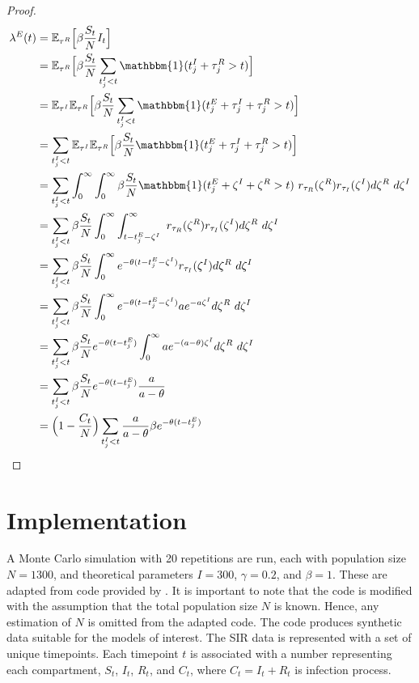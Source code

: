 \documentclass[12pt]{article}
\begin{document}
\begin{proof}
\begin{align*}
  \lambda^{E}(t) &= \mathbb{E}_{\tau^R} \Big [ \beta \frac{S_t}{N} I_t  \Big ] \\
  &= \mathbb{E}_{\tau^R} \Big [ \beta \frac{S_t}{N}  \sum_{t_j^I < t} \mathbbm{1} (t_j^I + \tau_j^R > t)  \Big ] \\
  &=  \mathbb{E}_{\tau^I} \mathbb{E}_{\tau^R} \Big [ \beta \frac{S_t}{N}  \sum_{t_j^I < t} \mathbbm{1} (t_j^E + \tau_j^I + \tau_j^R > t)  \Big ] \\
  &=  \sum_{t_j^I < t} \mathbb{E}_{\tau^I} \mathbb{E}_{\tau^R} \Big [ \beta \frac{S_t}{N} \mathbbm{1} (t_j^E + \tau_j^I + \tau_j^R > t)  \Big ] \\
  &=  \sum_{t_j^I < t} \int_0^\infty \int_0^\infty \beta \frac{S_t}{N}  \mathbbm{1} (t_j^E + \zeta^I + \zeta^R > t)\ r_{\tau_R}(\zeta^R) r_{\tau_I}(\zeta^I) d\zeta^R\ d\zeta^I \\
  &=  \sum_{t_j^I < t} \beta \frac{S_t}{N} \int_{0}^\infty \int_{t-t_j^E-\zeta^I}^\infty \ r_{\tau_R}(\zeta^R) r_{\tau_I}(\zeta^I) d\zeta^R\ d\zeta^I \\
  &=  \sum_{t_j^I < t} \beta \frac{S_t}{N} \int_{0}^\infty  e^{-\theta (t - t_j^E - \zeta^I)} r_{\tau_I}(\zeta^I) d\zeta^R\ d\zeta^I \\
  &=  \sum_{t_j^I < t} \beta \frac{S_t}{N} \int_{0}^\infty  e^{-\theta (t - t_j^E - \zeta^I)} a e^{-a \zeta^I} d\zeta^R\ d\zeta^I \\
  &=  \sum_{t_j^I < t} \beta \frac{S_t}{N} e^{-\theta (t - t_j^E)} \int_{0}^\infty   a e^{-(a - \theta) \zeta^I} d\zeta^R\ d\zeta^I \\
  &=  \sum_{t_j^I < t} \beta \frac{S_t}{N} e^{-\theta (t - t_j^E)} \frac{a}{a - \theta} \\
  &=  \Big ( 1 - \frac{C_t}{N} \Big )  \sum_{t_j^I < t} \frac{a}{a - \theta} \beta e^{-\theta (t - t_j^E)}  \\
\end{align*}


\end{proof}






\section{Implementation}

A Monte Carlo simulation with 20 repetitions are run, each with population size $N = 1300$, and theoretical parameters $I = 300$, $\gamma = 0.2$, and $\beta = 1$. These are adapted from code provided by \citep{Rizoiu2018}.  It is important to note that the code is modified with the assumption that the total population size $N$ is known. Hence, any estimation of $N$ is omitted from the adapted code. The code produces synthetic data suitable for the models of interest. The SIR data is represented with a set of unique timepoints. Each timepoint $t$ is associated with a number representing each compartment, $S_t$, $I_t$, $R_t$, and $C_t$, where $C_t = I_t + R_t$ is infection process. 
 
\end{document}
